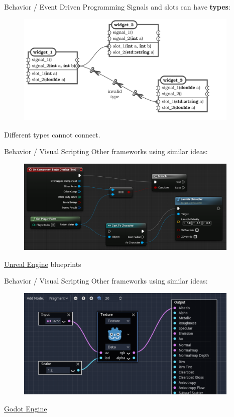 \documentclass[11pt]{beamer}
\renewcommand{\emph}[1]{\textbf{#1}}
\begin{document}
\begin{frame}{Behavior / Event Driven Programming}
 Signals and slots can have \emph{types}:
 \begin{figure}
  \includegraphics[width=0.95\textwidth]{assets/event-driven-programming-5}
 \end{figure}
 Different types cannot connect.
\end{frame}

\begin{frame}{Behavior / Visual Scripting}
 Other frameworks using similar ideas:
 \begin{center}
  \begin{figure}
   \includegraphics[width=0.95\textwidth]{assets/figure-visual-script-unreal}
  \end{figure}
  \href{https://www.unrealengine.com/en-US}{Unreal Engine} blueprints
 \end{center}
\end{frame}

\begin{frame}{Behavior / Visual Scripting}
 Other frameworks using similar ideas:
 \begin{center}
  \begin{figure}
   \includegraphics[width=0.95\textwidth]{assets/figure-visual-script-godot}
  \end{figure}
  \href{https://godotengine.org/}{Godot Engine}
 \end{center}
\end{frame}
\end{document}
